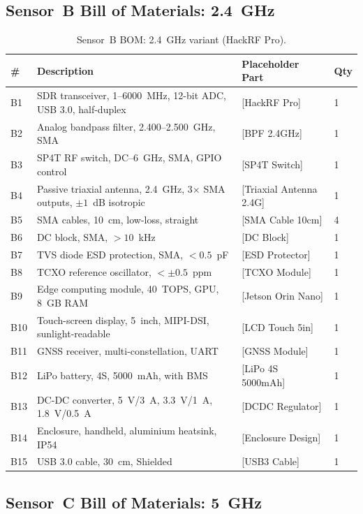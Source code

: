 \documentclass[11pt,a4paper]{article}
\begin{document}
\subsection{Sensor~B Bill of Materials: 2.4~GHz}

\begin{table}[ht]
\centering
\caption{Sensor~B BOM: 2.4~GHz variant (HackRF Pro).}
\label{tab:bom_sensorB}
\small
\begin{tabular}{L{1.0cm} L{5.0cm} L{4.0cm} C{2.0cm}}
\toprule
\textbf{\#} & \textbf{Description} & \textbf{Placeholder Part} & \textbf{Qty} \\
\midrule
B1 & SDR transceiver, 1--6000~MHz, 12-bit ADC, USB 3.0, half-duplex & [HackRF Pro] & 1 \\
B2 & Analog bandpass filter, 2.400--2.500~GHz, SMA & [BPF 2.4GHz] & 1 \\
B3 & SP4T RF switch, DC--6~GHz, SMA, GPIO control & [SP4T Switch] & 1 \\
B4 & Passive triaxial antenna, 2.4~GHz, 3$\times$ SMA outputs, $\pm 1$~dB isotropic & [Triaxial Antenna 2.4G] & 1 \\
B5 & SMA cables, 10~cm, low-loss, straight & [SMA Cable 10cm] & 4 \\
B6 & DC block, SMA, $> 10$~kHz & [DC Block] & 1 \\
B7 & TVS diode ESD protection, SMA, $< 0.5$~pF & [ESD Protector] & 1 \\
B8 & TCXO reference oscillator, $< \pm 0.5$~ppm & [TCXO Module] & 1 \\
B9 & Edge computing module, 40~TOPS, GPU, 8~GB RAM & [Jetson Orin Nano] & 1 \\
B10 & Touch-screen display, 5~inch, MIPI-DSI, sunlight-readable & [LCD Touch 5in] & 1 \\
B11 & GNSS receiver, multi-constellation, UART & [GNSS Module] & 1 \\
B12 & LiPo battery, 4S, 5000~mAh, with BMS & [LiPo 4S 5000mAh] & 1 \\
B13 & DC-DC converter, 5~V/3~A, 3.3~V/1~A, 1.8~V/0.5~A & [DCDC Regulator] & 1 \\
B14 & Enclosure, handheld, aluminium heatsink, IP54 & [Enclosure Design] & 1 \\
B15 & USB 3.0 cable, 30~cm, Shielded & [USB3 Cable] & 1 \\
\bottomrule
\end{tabular}
\end{table}

\subsection{Sensor~C Bill of Materials: 5~GHz}
\end{document}
